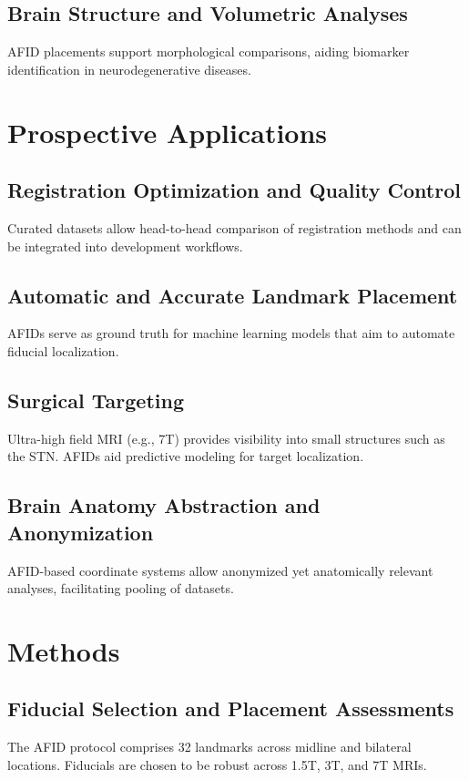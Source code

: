 \subsection{Brain Structure and Volumetric Analyses}
AFID placements support morphological comparisons, aiding biomarker identification in neurodegenerative diseases.

\section{Prospective Applications}
\subsection{Registration Optimization and Quality Control}
Curated datasets allow head-to-head comparison of registration methods and can be integrated into development workflows.

\subsection{Automatic and Accurate Landmark Placement}
AFIDs serve as ground truth for machine learning models that aim to automate fiducial localization.

\subsection{Surgical Targeting}
Ultra-high field MRI (e.g., 7T) provides visibility into small structures such as the STN. AFIDs aid predictive modeling for target localization.

\subsection{Brain Anatomy Abstraction and Anonymization}
AFID-based coordinate systems allow anonymized yet anatomically relevant analyses, facilitating pooling of datasets.

\section{Methods}
\subsection{Fiducial Selection and Placement Assessments}
The AFID protocol comprises 32 landmarks across midline and bilateral locations. Fiducials are chosen to be robust across 1.5T, 3T, and 7T MRIs.

